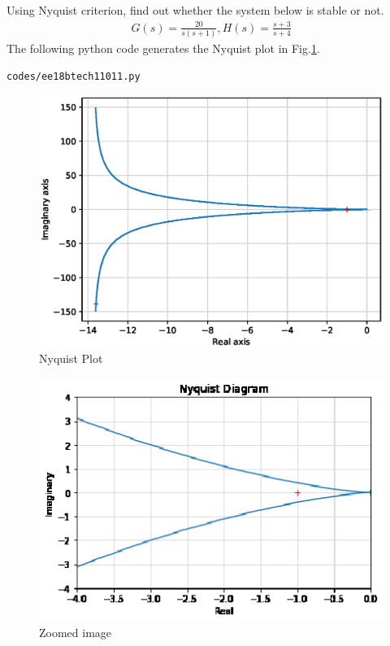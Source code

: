 \item Using Nyquist criterion, find out whether the system below is stable or not.
\begin{align}
\label{eq:ee18btech11011_system}
 G(s)=\frac{20}{s(s+1)} , 
 H(s)=\frac{s+3}{s+4}
\end{align}
\solution The following python code generates the Nyquist plot in Fig.\ref{fig:ee18btech11011}.
\begin{lstlisting}
codes/ee18btech11011.py
\end{lstlisting}
\begin{figure}[ht!]
  \includegraphics[width=\columnwidth]{./figs/ee18btech11011.eps}
  \caption{Nyquist Plot}
  \label{fig:ee18btech11011}
\end{figure}
\begin{figure}[ht!]
  \includegraphics[width=\columnwidth]{./figs/zoomed.eps}
  \caption{Zoomed image}
  \label{fig:zoomed}
\end{figure}
